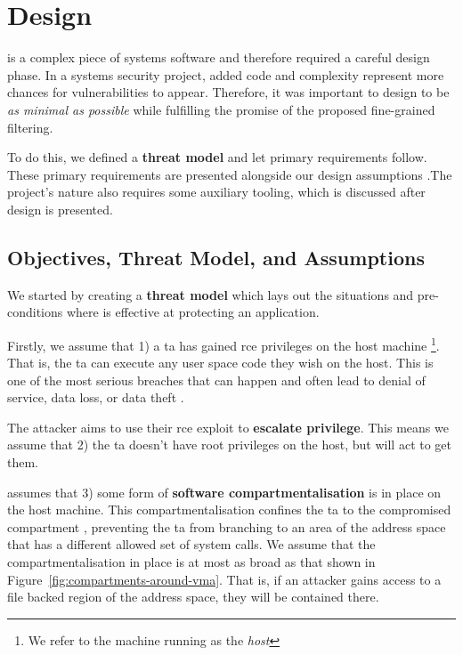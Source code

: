 \section{Design} \label{sec:design}

%
        

\af is a complex piece of systems software and therefore required a careful
design phase. In a systems security project, added code and complexity
represent more chances for vulnerabilities to appear. Therefore, it was
important to design \af to be \textit{as minimal as possible} while
fulfilling the promise of the proposed fine-grained filtering.

To do this, we defined a \textbf{threat model} and let primary requirements
follow. These primary requirements are presented alongside our design
assumptions .The project's nature also requires some
auxiliary tooling, which is discussed after \afg design is
presented.

\subsection{Objectives, Threat Model, and Assumptions}\label{subsec:threat-model} 

We started by creating a \textbf{threat model} which lays out the situations and
pre-conditions where \af is effective at protecting an application.

Firstly, we assume that 1) a \ac{ta} has gained \ac{rce} privileges on the host
machine \footnote{We refer to the machine running \af as the \textit{host
}}. That is, the \ac{ta} can execute any user space code they wish on the
host. This is one of the most serious breaches that can happen and often
lead to denial of service, data loss, or data theft \cite{RCE_BAD}. 

The attacker aims to use their \ac{rce} exploit to \textbf{escalate privilege}. This
means we assume that 2) the \ac{ta} doesn't have root privileges on the host,
but will act to get them.

\af assumes that 3) some form of \textbf{software compartmentalisation} is in
place on the host machine. This compartmentalisation confines the \ac{ta} to the
compromised compartment \cite{SOK}, preventing the \ac{ta} 
from branching to an area of the address space that has a different allowed set
of system calls. We assume that the compartmentalisation in place is at most as
broad as that shown in Figure~\ref{fig:compartments-around-vma}. That is, if an
attacker gains access to a file backed region of the address space, they will be
contained there.

